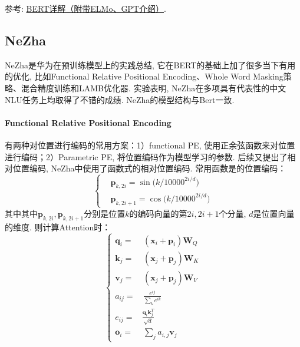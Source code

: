 参考: \href{https://cloud.tencent.com/developer/article/1666168}{BERT详解（附带ELMo、GPT介绍）}.

\subsection{NeZha}
NeZha\cite{junqiu2019nezha}是华为在预训练模型上的实践总结, 它在BERT的基础上加了很多当下有用的优化, 比如Functional Relative Positional Encoding、Whole Word Masking策略、混合精度训练和LAMB优化器. 实验表明, NeZha在多项具有代表性的中文NLU任务上均取得了不错的成绩. NeZha的模型结构与Bert一致. 
\paragraph{Functional Relative Positional Encoding}有两种对位置进行编码的常用方案：1）functional PE, 使用正余弦函数来对位置进行编码；2）Parametric PE, 将位置编码作为模型学习的参数. 后续又提出了相对位置编码, NeZha中使用了函数式的相对位置编码. 常用函数是的位置编码：
$$
\begin{equation}\nonumber
	\left\{\begin{aligned}&\boldsymbol{p}_{k,2i}=\sin\Big(k/10000^{2i/d}\Big)\\ 
		&\boldsymbol{p}_{k, 2i+1}=\cos\Big(k/10000^{2i/d}\Big) 
	\end{aligned}\right.
\end{equation}
$$
其中其中$\boldsymbol{p}_{k,2i}, \boldsymbol{p}_{k,2i+1}$分别是位置$k$的编码向量的第$2i, 2i+1$个分量, $d$是位置向量的维度. 则计算Attention时：
$$
\begin{equation}\nonumber
	\left\{
	\begin{aligned} 
		\boldsymbol{q}_i =&\, (\boldsymbol{x}_i + \boldsymbol{p}_i)\boldsymbol{W}_Q \\ 
		\boldsymbol{k}_j =&\, (\boldsymbol{x}_j + \boldsymbol{p}_j)\boldsymbol{W}_K \\ 
		\boldsymbol{v}_j =&\, (\boldsymbol{x}_j + \boldsymbol{p}_j)\boldsymbol{W}_V \\ 
		a_{ij} =&\, \frac{e^{ij}}{\sum_k e^{ik}}\\ 
		e_{ij} =& \frac{\boldsymbol{q}_i \boldsymbol{k}_j^T}{\sqrt{d}}\\
		\boldsymbol{o}_i =&\, \sum_j a_{i,j}\boldsymbol{v}_j 
	\end{aligned}\right.
\end{equation}
$$

